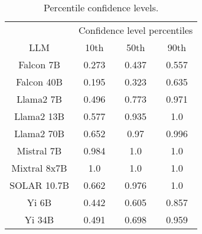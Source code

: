 \begin{table*}
\centering
\begin{tabular}{c|c|c|c}
& \multicolumn{3}{c}{Confidence level percentiles} \\ 
LLM & 10th & 50th & 90th\\ \hline
Falcon 7B & 0.273 & 0.437 & 0.557\\
Falcon 40B & 0.195 & 0.323 & 0.635\\
Llama2 7B & 0.496 & 0.773 & 0.971\\
Llama2 13B & 0.577 & 0.935 & 1.0\\
Llama2 70B & 0.652 & 0.97 & 0.996\\
Mistral 7B & 0.984 & 1.0 & 1.0\\
Mixtral 8x7B & 1.0 & 1.0 & 1.0\\
SOLAR 10.7B & 0.662 & 0.976 & 1.0\\
Yi 6B & 0.442 & 0.605 & 0.857\\
Yi 34B & 0.491 & 0.698 & 0.959\\
\hline
\end{tabular}
\caption{Percentile confidence levels.}
\label{tab:percentile_conf}
\end{table*}
